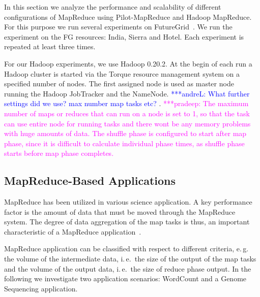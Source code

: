 \documentclass{acm_proc_article-sp}
\newcommand{\alnote}[1]{ {\textcolor{blue} { ***andreL: #1 }}}
\newcommand{\pnote}[1]{ {\textcolor{magenta} { ***pradeep: #1 }}}
\newcommand{\alnote}[1]{}
\newcommand{\pnote}[1]{}
\newcommand{\pilotmapreduce}{Pilot-MapReduce\xspace}
\begin{document}
In this section we analyze the performance and scalability of different
configurations of MapReduce using \pilotmapreduce and Hadoop MapReduce. For this
purpose we run several experiments on FutureGrid~\cite{fg}. We run the
experiment on the FG resources: India, Sierra and Hotel. Each experiment is
repeated at least three times.

For our Hadoop experiments, we use Hadoop 0.20.2. At the begin of each run a 
Hadoop cluster is started via the Torque resource management system on a
specified number of nodes. The first assigned node is used as master node
running the Hadoop JobTracker and the NameNode. \alnote{What further settings
did we use? max number map tasks etc?}. \pnote{The maximum number of maps or 
reduces that can run on a node is set to 1, so that the task can use entire
node for running tasks and there wont be any memory problems with huge amounts
of data. The shuffle phase is configured to start after map phase, since it is
difficult to calculate individual phase times, as shuffle phase starts before
map phase completes.}


\subsection{MapReduce-Based Applications}

MapReduce has been utilized in various science application. A key performance 
factor is the amount of data that must be moved through the MapReduce system. 
The degree of data aggregation of the map tasks is thus, an important 
characteristic of a MapReduce application~\cite{weissman-mr-11}.

MapReduce application can be classified with respect to different criteria,
e.\,g.\, the volume of the intermediate data, i.\,e.\ the size of the output
of the map tasks and the volume of the output data, i.\,e.\ the size of reduce
phase output. In the following we investigate two application scenarios: 
WordCount and a Genome Sequencing application.
\end{document}
